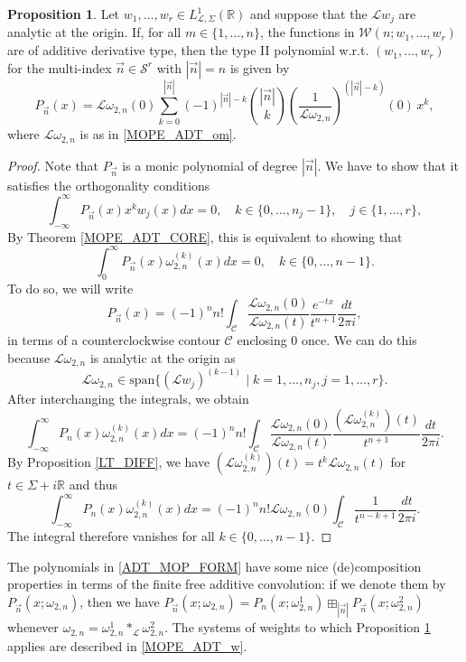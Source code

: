 \documentclass[a4paper,12pt,oneside]{article}
\theoremstyle{definition}
\newtheorem{prop}[defi]{Proposition}
\newcommand{\R}{\mathbb{R}}
\newcommand{\om}{\omega}
\newcommand{\sz}[1]{\left| \vec{#1} \right|}
\newcommand{\spn}[1]{\text{span}\{#1\}}
\newcommand{\LT}[1]{\mathcal{L}#1}
\begin{document}
\begin{prop} \label{ADT_MOP}  
     Let $w_1,\dots,w_r\in L^1_{\LT{},\Sigma}(\R)$ and suppose that the $\LT{w_j}$ are analytic at the origin. If, for all $m\in\{1,\dots,n\}$, the functions in $\mathcal{W}(n;w_1,\dots,w_r)$ are of additive derivative type, then the type II polynomial w.r.t. $(w_1,\dots,w_r)$ for the multi-index $\vec{n}\in\mathcal{S}^r$ with $\sz{n}=n$ is given by
    \begin{equation} \label{ADT_MOP_FORM}
        P_{\vec{n}}(x) = \LT{\om_{2,n}}(0) \sum_{k=0}^{\sz{n}} (-1)^{\sz{n}-k} \binom{\sz{n}}{k} \left(\frac{1}{\LT{\om_{2,n}}}\right)^{(\sz{n}-k)}(0)\, x^k,
    \end{equation}
    where $\LT{\om_{2,n}}$ is as in \eqref{MOPE_ADT_om}.
\end{prop}
\begin{proof}
    Note that $P_{\vec{n}}$ is a monic polynomial of degree $\sz{n}$. We have to show that it satisfies the orthogonality conditions
        $$ \int_{-\infty}^\infty P_{\vec{n}}(x) x^k w_j(x) dx = 0,\quad k\in\{0,\dots,n_j-1\},\quad j\in\{1,\dots,r\}, $$
    By Theorem \ref{MOPE_ADT_CORE}, this is equivalent to showing that
        $$ \int_0^\infty P_{\vec{n}}(x) \om_{2,n}^{(k)}(x) dx = 0,\quad k\in\{0,\dots,n-1\}. $$
    To do so, we will write
        $$ P_{\vec{n}}(x) = (-1)^n n! \int_{\mathcal{C}} \frac{\LT{\om_{2,n}}(0)}{\LT{\om_{2,n}}(t)}  \frac{e^{-tx}}{t^{n+1}} \frac{dt}{2\pi i},  $$
    in terms of a counterclockwise contour $\mathcal{C}$ enclosing $0$ once. We can do this because $\LT{\om_{2,n}}$ is analytic at the origin as 
    $$\LT{\om_{2,n}}\in\spn{(\LT{w_j)^{(k-1)}} \mid k=1,\dots,n_j,j=1,\dots,r}.$$ 
    After interchanging the integrals, we obtain
    $$\int_{-\infty}^\infty P_n(x) \om_{2,n}^{(k)}(x) dx = (-1)^n n! \int_{\mathcal{C}} \frac{\LT{\om_{2,n}}(0)}{\LT{\om_{2,n}}(t)}  \frac{(\LT{\om_{2,n}^{(k)})(t)}}{t^{n+1}} \frac{dt}{2\pi i}. $$
    By Proposition \ref{LT_DIFF}, we have $(\LT{\om_{2,n}^{(k)}})(t)=t^k \LT{\om_{2,n}}(t)$ for $t\in\Sigma+i\R$ and thus
    $$\int_{-\infty}^\infty P_n(x) \om_{2,n}^{(k)}(x) dx = (-1)^n n! \LT{\om_{2,n}}(0) \int_{\mathcal{C}} \frac{1}{t^{n-k+1}} \frac{dt}{2\pi i}.$$
    The integral therefore vanishes for all $k\in\{0,\dots,n-1\}$.   
\end{proof}

The polynomials in \eqref{ADT_MOP_FORM} have some nice (de)composition properties in terms of the finite free additive convolution: if we denote them by $P_{\vec{n}}(x;\om_{2,n})$, then we have $P_{\vec{n}}(x;\om_{2,n}) = P_{n}(x;\om_{2,n}^1) \boxplus_{\sz{n}} P_{\vec{n}}(x;\om_{2,n}^2)$ whenever $\om_{2,n}=\om_{2,n}^1\ast_{\LT{}}\om_{2,n}^2$. The systems of weights to which Proposition \ref{ADT_MOP} applies are described in \eqref{MOPE_ADT_w}.
\end{document}
